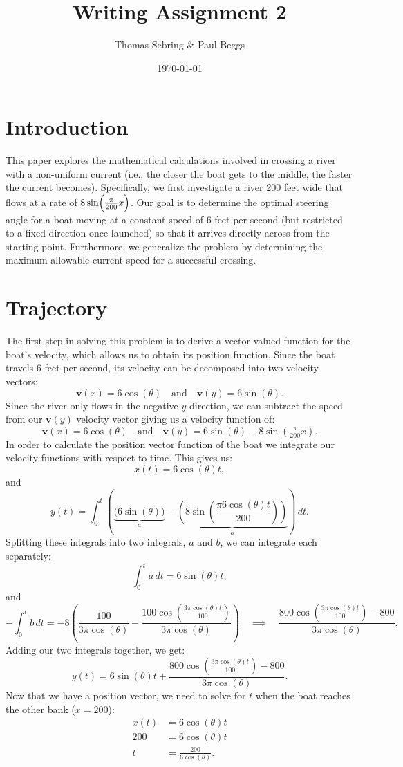 \documentclass{article}
\title{Writing Assignment 2}
\author{Thomas Sebring \& Paul Beggs}
\date{\today}
\newcommand{\mb}[1]{\mathbf{#1}}
\begin{document}
\maketitle

\section{Introduction}

This paper explores the mathematical calculations involved in crossing a river with a non-uniform current (i.e., the closer the boat gets to the middle, the faster the current becomes). Specifically, we first investigate a river 200 feet wide that flows at a rate of \(8\sin\Bigl(\frac{\pi}{200}x\Bigr)\). Our goal is to determine the optimal steering angle for a boat moving at a constant speed of 6 feet per second (but restricted to a fixed direction once launched) so that it arrives directly across from the starting point. Furthermore, we generalize the problem by determining the maximum allowable current speed for a successful crossing.

\section{Trajectory}

The first step in solving this problem is to derive a vector-valued function for the boat's velocity, which allows us to obtain its position function. Since the boat travels 6 feet per second, its velocity can be decomposed into two velocity vectors:
\[
  \mb{v}(x) = 6\cos(\theta) \quad \text{and} \quad \mb{v}(y) = 6\sin(\theta).
\] 
Since the river only flows in the negative \(y\) direction, we can subtract the speed from our \(\mb{v}(y)\) velocity vector giving us a velocity function of:
\[
  \mb{v}(x) = 6\cos(\theta) \quad \text{and} \quad \mb{v}(y) = 6\sin(\theta) - 8\sin(\tfrac{\pi}{200}x).
\]
In order to calculate the position vector function of the boat we integrate our velocity functions with respect to time. This gives us:
\[
    x(t) = 6\cos(\theta) t,
\]
and 
\[
    y(t) = \int_0^{t} \left(\underbrace{\bigl(6 \sin(\theta)\bigr)}_{a} - \underbrace{\left(8 \sin \left(\frac{\pi 6\cos(\theta)t}{200}\right)\right)}_{b}\right) \, dt.
\]
Splitting these integrals into two integrals, \(a\) and \(b\), we can integrate each separately:
\[
    \int_0^{t} a \, dt = 6\sin(\theta) t,
\]
and 
\[
    -\int_0^{t} b \, dt = -8\left(\frac{100}{3\pi\cos(\theta)} - \frac{100\cos\left(\frac{3\pi\cos(\theta)t}{100}\right)}{3\pi\cos(\theta)}\right) \quad \implies \quad \frac{800\cos\left(\frac{3\pi\cos(\theta)t}{100}\right) - 800}{3\pi\cos(\theta)}.
\]
Adding our two integrals together, we get:
\[
    y(t) = 6\sin(\theta) t + \frac{800\cos\left(\frac{3\pi\cos(\theta)t}{100}\right) - 800}{3\pi\cos(\theta)}. 
\]
Now that we have a position vector, we need to solve for \(t\) when the boat reaches the other bank (\(x = 200\)):
\begin{align*}
    x(t) &= 6 \cos(\theta) t \\
    200 &= 6 \cos(\theta) t \\
    t &= \frac{200}{6 \cos(\theta)}.
\end{align*}
\end{document}
